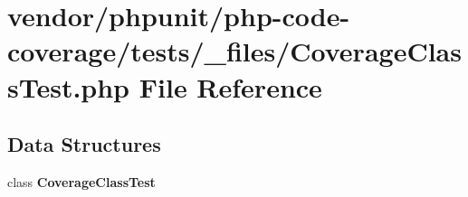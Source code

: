 \section{vendor/phpunit/php-\/code-\/coverage/tests/\+\_\+files/\+Coverage\+Class\+Test.php File Reference}
\label{php-code-coverage_2tests_2__files_2_coverage_class_test_8php}
\subsection*{Data Structures}
\begin{DoxyCompactItemize}
\item 
class {\bf Coverage\+Class\+Test}
\end{DoxyCompactItemize}
